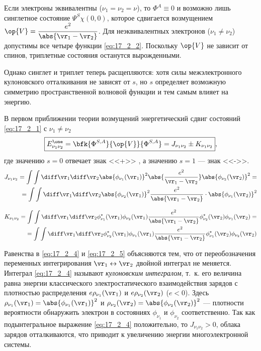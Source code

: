 Если электроны эквивалентны ($\nu_1 = \nu_2= \nu$), то $\Phi^A \equiv 0$ и возможно лишь синглетное состояние $\Psi^S \chi(0, 0)$, которое сдвигается возмущением ${\op{V} = \dfrac{e^2}{\abs{\vr_1 - \vr_2}}}$. Для неэквивалентных электронов ($\nu_1 \neq \nu_2$) допустимы все четыре функции \eqref{eq:17_2_2}. Поскольку $\op{V}$ не зависит от спинов, триплетные состояния останутся вырожденными.

Однако синглет и триплет теперь расщепляются: хотя силы межэлектронного кулоновского отталкивания не зависят от $s$, но $s$ определяет возможную симметрию пространственной волновой функции и тем самым влияет на энергию.

В первом приближении теории возмущений энергетический сдвиг состояний \eqref{eq:17_2_1} с $\nu_1 \neq \nu_2$
\begin{equation}
\label{eq:17_2_3}
\boxed{E_{\nu_1 \nu_2}^\one = \bfk{\Phi^{S, A}}{\op{V}}{\Phi^{S, A}} = J_{\nu_1 \nu_2} \pm K_{\nu_1 \nu_2}},
\end{equation}
где значению $s = 0$ отвечает знак <<+>> , а значению $s = 1$ --- знак <<->>.
\begin{eqnarray}
\label{eq:17_2_4}
J_{\nu_1 \nu_2} = \int \int \diff\vr_1 \diff\vr_2 \abs{\phi_{\nu_1}(\vr_1)}^2 \abs{\frac{e^2}{\vr_1 - \vr_2}} \abs{\phi_{\nu_2}(\vr_2)}^2 = \nonumber \\ = \int \int \diff\vr_1 \diff\vr_2 \abs{\phi_{\nu_2}(\vr_1)}^2 \frac{e^2}{\abs{\vr_1 - \vr_2}} \cdot \abs{\phi_{\nu_1}(\vr_2)}^2
\end{eqnarray}

\begin{eqnarray}
\label{eq:17_2_5}
K_{\nu_1 \nu_2} = \int \int \diff\vr_1 \diff\vr_2 \phi^*_{\nu_1}(\vr_1) \phi_{\nu_2}(\vr_1)\frac{e^2}{\abs{\vr_1 - \vr_2}}  \phi^*_{\nu_2}(\vr_2) \phi_{\nu_1}(\vr_2) = \nonumber \\
= \int \int \diff\vr_1 \diff\vr_2 \phi^*_{\nu_2}(\vr_1) \phi_{\nu_1}(\vr_1)\frac{e^2}{\abs{\vr_1 - \vr_2}}  \phi^*_{\nu_1}(\vr_2) \phi_{\nu_2}(\vr_2)
\end{eqnarray}

Равенства в \eqref{eq:17_2_4} и \eqref{eq:17_2_5} объясняются тем, что от переобозначения переменных интегрирования $\vr_1 \leftrightarrow \vr_2$ двойной интеграл не меняется. Интеграл \eqref{eq:17_2_4} называют {\em кулоновским интегралом}, т.~к. его величина равна энергии классического электростатического взаимодействия зарядов с плотностью распределения $e\rho_{\nu_1}(\vr_1)$ и $e\rho_{\nu_2}(\vr_2)$ ($e < 0$). Здесь $\rho_{\nu_1}(\vr_1) = \abs{\phi_{\nu_1}(\vr_1)}^2$ и $\rho_{\nu_2}(\vr_2) = \abs{\phi_{\nu_2}(\vr_2)}^2$ --- плотности вероятности обнаружить электрон в состояниях $\phi_{\nu_1}$ и $\phi_{\nu_2}$ соответственно. Так как подынтегральное выражение \eqref{eq:17_2_4} положительно, то $J_{\nu_1 \nu_2} > 0$, облака зарядов отталкиваются, что приводит к увеличению энергии многоэлектронной системы.

